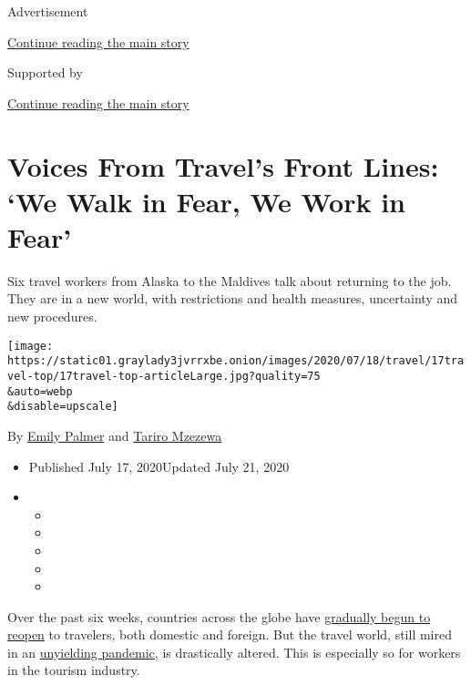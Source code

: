 Advertisement

\protect\hyperlink{after-top}{Continue reading the main story}

Supported by

\protect\hyperlink{after-sponsor}{Continue reading the main story}

\hypertarget{voices-from-travels-front-lines-we-walk-in-fear-we-work-in-fear}{%
\section{Voices From Travel's Front Lines: `We Walk in Fear, We Work in
Fear'}\label{voices-from-travels-front-lines-we-walk-in-fear-we-work-in-fear}}

Six travel workers from Alaska to the Maldives talk about returning to
the job. They are in a new world, with restrictions and health measures,
uncertainty and new procedures.

\texttt{[image: https://static01.graylady3jvrrxbe.onion/images/2020/07/18/travel/17travel-top/17travel-top-articleLarge.jpg?quality=75\\\&auto=webp\\\&disable=upscale]}

By \href{https://www.nytimes3xbfgragh.onion/by/emily-palmer}{Emily
Palmer} and
\href{https://www.nytimes3xbfgragh.onion/by/tariro-mzezewa}{Tariro
Mzezewa}

\begin{itemize}
\item
  Published July 17, 2020Updated July 21, 2020
\item
  \begin{itemize}
  \item
  \item
  \item
  \item
  \item
  \end{itemize}
\end{itemize}

Over the past six weeks, countries across the globe have
\href{https://www.nytimes3xbfgragh.onion/2020/06/12/travel/reopening-europe-caribbean-virus.html}{gradually
begun to reopen} to travelers, both domestic and foreign. But the travel
world, still mired in an
\href{https://www.nytimes3xbfgragh.onion/news-event/coronavirus?action=click\&pgtype=Article\&state=default\&module=styln-coronavirus-national\&variant=show\&region=TOP_BANNER\&context=storylines_menu}{unyielding
pandemic}, is drastically altered. This is especially so for workers in
the tourism industry.

